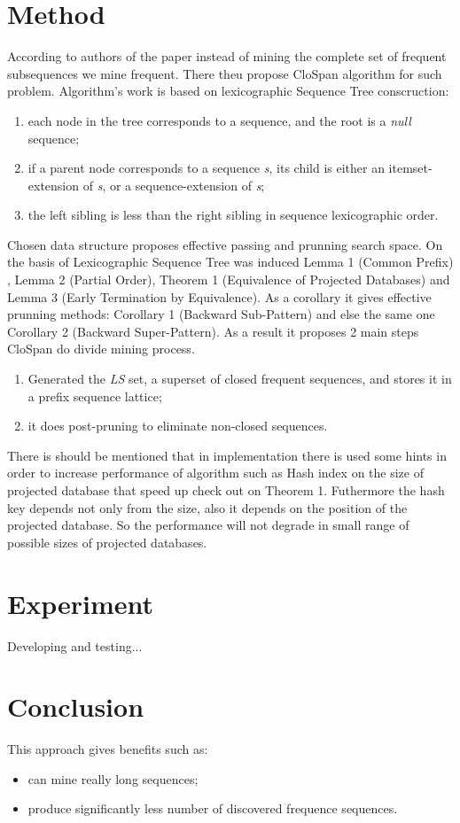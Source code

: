 \documentclass[journal]{IEEEtran}
\begin{document}
\section{Method}
According to authors of the paper \cite{CloSpan} instead of mining the complete set of frequent subsequences we mine frequent. There theu propose CloSpan algorithm for such problem. Algorithm's work is based on lexicographic Sequence Tree conscruction:
\begin{enumerate}
\item each node in the tree corresponds to a sequence, and the root is a {\it null} sequence;
\item if a parent node corresponds to a sequence {\it s}, its child is either an itemset-extension of {\it s}, or a sequence-extension of {\it s};
\item the left sibling is less than the right sibling in sequence lexicographic order.
\end{enumerate}
Chosen data structure proposes effective passing and prunning search space. On the basis of Lexicographic Sequence Tree was induced Lemma 1 (Common Prefix) , Lemma 2 (Partial Order), Theorem 1 (Equivalence of Projected Databases) and Lemma 3 (Early Termination by Equivalence). As a corollary it gives effective prunning methods: Corollary 1 (Backward Sub-Pattern) and else the same one Corollary 2 (Backward Super-Pattern). As a result it proposes 2 main steps CloSpan do divide mining process.
\begin{enumerate}
\item Generated the {\it LS} set, a superset of closed frequent sequences, and stores it in a prefix sequence lattice;
\item it does post-pruning to eliminate non-closed sequences.
\end{enumerate}
There is should be mentioned that in implementation there is used some hints in order to increase performance of algorithm such as Hash index on the size of projected database that speed up check out on Theorem 1. Futhermore the hash key depends not only from the size, also it depends on the position of the projected database. So the performance will not degrade  in small range of possible sizes of projected databases.

\section{Experiment}
Developing and testing...

\section{Conclusion}
This approach gives benefits such as:
\begin{itemize}
  \item can mine really long sequences;
  \item produce significantly less number of discovered frequence sequences.
\end{itemize}
\end{document}
